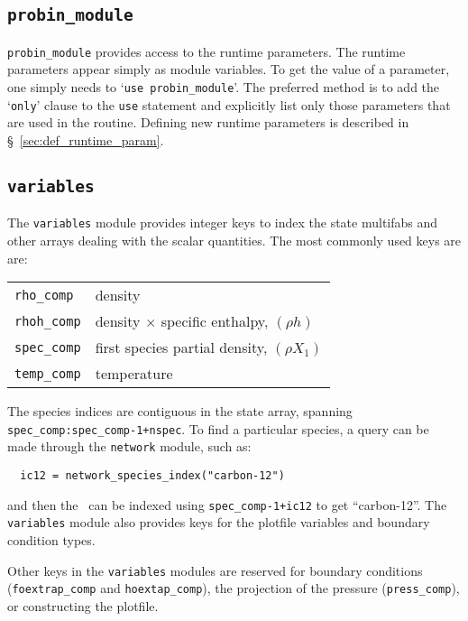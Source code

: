 \subsection{{\tt probin\_module}}

\label{sec:probin}

{\tt probin\_module} provides access to the runtime parameters.
The runtime parameters appear simply as module variables.  To get the 
value of a parameter, one simply needs to `{\tt use probin\_module}'.
The preferred method is to add the `{\tt only}' clause to the
{\tt use} statement and explicitly list only those parameters that
are used in the routine.  Defining new runtime parameters is
described in \S~\ref{sec:def_runtime_param}.

\subsection{{\tt variables}}

\label{sec:variables_module}

The {\tt variables} module provides integer keys to index the state
multifabs and other arrays dealing with the scalar quantities.  The
most commonly used keys are are:

\begin{center}
\begin{tabular}{ll}
\hline
{\tt rho\_comp}  & density \\
{\tt rhoh\_comp} & density $\times$ specific enthalpy, $(\rho h)$ \\
{\tt spec\_comp} & first species partial density, $(\rho X_1)$ \\
{\tt temp\_comp} & temperature \\
\hline
\end{tabular}
\end{center}

The species indices are contiguous in the state array, spanning {\tt
  spec\_comp:spec\_comp-1+nspec}.  To find a particular species, a
query can be made through the {\tt network} module, such as:
\begin{verbatim}
  ic12 = network_species_index("carbon-12")
\end{verbatim}
and then the \fab\ can be indexed using {\tt spec\_comp-1+ic12} to
get ``carbon-12''.
The {\tt variables} module also provides keys for the plotfile
variables and boundary condition types.

Other keys in the {\tt variables} modules are reserved for boundary
conditions ({\tt foextrap\_comp} and {\tt hoextap\_comp}), the
projection of the pressure ({\tt press\_comp}), or constructing
the plotfile.


